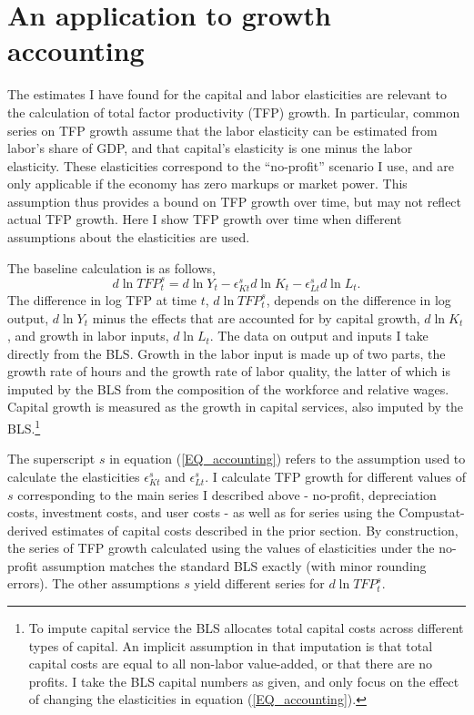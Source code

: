 \documentclass[11pt]{article}
\begin{document}
\section{An application to growth accounting}\label{SEC_accounting}
The estimates I have found for the capital and labor elasticities are relevant to the calculation of total factor productivity (TFP) growth. In particular, common series on TFP growth assume that the labor elasticity can be estimated from labor's share of GDP, and that capital's elasticity is one minus the labor elasticity. These elasticities correspond to the ``no-profit'' scenario I use, and are only applicable if the economy has zero markups or market power. This assumption thus provides a bound on TFP growth over time, but may not reflect actual TFP growth. Here I show TFP growth over time when different assumptions about the elasticities are used. 

The baseline calculation is as follows,
\begin{equation}
	d \ln TFP^s_t = d \ln Y_t - \epsilon^s_{Kt} d \ln K_t - \epsilon^s_{Lt} d \ln L_t. \label{EQ_accounting}
\end{equation}
The difference in log TFP at time $t$, $d \ln TFP^s_t$, depends on the difference in log output, $d \ln Y_t$ minus the effects that are accounted for by capital growth, $d \ln K_t$, and growth in labor inputs, $d \ln L_t$. The data on output and inputs I take directly from the BLS. Growth in the labor input is made up of two parts, the growth rate of hours and the growth rate of labor quality, the latter of which is imputed by the BLS from the composition of the workforce and relative wages. Capital growth is measured as the growth in capital services, also imputed by the BLS.\footnote{To impute capital service the BLS allocates total capital costs across different types of capital. An implicit assumption in that imputation is that total capital costs are equal to all non-labor value-added, or that there are no profits. I take the BLS capital numbers as given, and only focus on the effect of changing the elasticities in equation (\ref{EQ_accounting}).}

The superscript $s$ in equation (\ref{EQ_accounting}) refers to the assumption used to calculate the elasticities $\epsilon^s_{Kt}$ and $\epsilon^s_{Lt}$. I calculate TFP growth for different values of $s$ corresponding to the main series I described above - no-profit, depreciation costs, investment costs, and user costs - as well as for series using the Compustat-derived estimates of capital costs described in the prior section. By construction, the series of TFP growth calculated using the values of elasticities under the no-profit assumption matches the standard BLS exactly (with minor rounding errors). The other assumptions $s$ yield different series for $d \ln TFP^s_t$.
\end{document}
